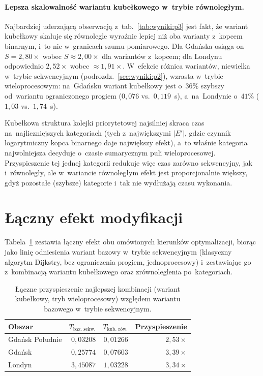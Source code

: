 \clearpage

\paragraph{Lepsza skalowalność wariantu kubełkowego w~trybie równoległym.}
Najbardziej uderzającą obserwacją z~tab.~\ref{tab:wyniki:p3} jest fakt,
że wariant kubełkowy skaluje się równolegle wyraźnie lepiej niż oba warianty
z~kopcem binarnym, i~to nie w~granicach szumu pomiarowego. Dla Gdańska
osiąga on $S=2{,}80\times$ wobec $S\approx 2{,}00\times$ dla wariantów z~kopcem;
dla Londynu odpowiednio $2{,}52\times$ wobec $\approx 1{,}91\times$.
W~efekcie różnica wariantów, niewielka w~trybie sekwencyjnym
(podrozdz.~\ref{sec:wyniki:p2}), wzrasta w~trybie wieloprocesowym: na~Gdańsku
wariant kubełkowy jest o~$36\%$ szybszy od~wariantu ograniczonego progiem
($0{,}076$ vs.\ $0{,}119$~s), a~na~Londynie o~$41\%$ ($1{,}03$ vs.\ $1{,}74$~s).

Kubełkowa struktura kolejki priorytetowej najsilniej skraca czas na~najliczniejszych
kategoriach (tych z~największymi $|E'|$, gdzie czynnik logarytmiczny kopca
binarnego daje największy efekt), a~to właśnie kategoria najwolniejsza
decyduje o~czasie sumarycznym puli wieloprocesowej. Przyspieszenie tej
jednej kategorii redukuje więc czas zarówno sekwencyjny, jak i~równoległy,
ale w~wariancie równoległym efekt jest proporcjonalnie większy, gdyż
pozostałe (szybsze) kategorie i~tak nie wydłużają czasu wykonania.

\section{Łączny efekt modyfikacji}
\label{sec:wyniki:laczne}

Tabela~\ref{tab:wyniki:czasy_najlepsze} zestawia łączny efekt obu
omówionych kierunków optymalizacji, biorąc jako linię odniesienia wariant
bazowy w~trybie sekwencyjnym (klasyczny algorytm Dijkstry, bez ograniczenia
progiem, jednoprocesowy) i~zestawiając go z~kombinacją wariantu kubełkowego
oraz zrównoleglenia po~kategoriach.

\begin{table}[H]
\centering
\caption{Łączne przyspieszenie najlepszej kombinacji (wariant kubełkowy,
tryb wieloprocesowy) względem wariantu bazowego w~trybie sekwencyjnym.}
\label{tab:wyniki:czasy_najlepsze}
\begin{tabular}{l r r r}
\hline
\textbf{Obszar} & $T_{\text{baz.\ sekw.}}$ & $T_{\text{kub.\ rów.}}$
& \textbf{Przyspieszenie} \\
\hline
Gdańsk Południe & $0{,}03208$ & $0{,}01266$ & $2{,}53\times$ \\
Gdańsk          & $0{,}25774$ & $0{,}07603$ & $3{,}39\times$ \\
Londyn          & $3{,}45087$ & $1{,}03228$ & $3{,}34\times$ \\
\hline
\end{tabular}
\end{table}

